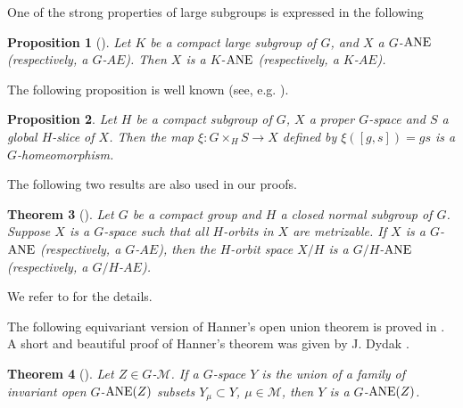 \documentclass{amsart}
\newtheorem{theorem}{Theorem}[section]
\newtheorem{proposition}[theorem]{Proposition}
\begin{document}
\medskip


One of the strong properties of large subgroups is expressed in the following

\begin{proposition}[{\cite[Proposition 3.4]{ant:jap}}]\label{P:large} Let $K$  be a compact  large  subgroup of $G$, and $X$  a  $G$-${\rm ANE}$ (respectively, a $G$-$AE$). Then  $X$ is  a $K$-${\rm ANE}$ (respectively, a $K$-$AE$).
\end{proposition}


\medskip
  
  The following proposition is well known  (see, e.g. \cite[Lemma 3.5]{abe:78}).
  
  \begin{proposition}\label{twist} Let  $H$ be a compact subgroup of $G$, $X$  a proper $G$-space and  $S$ a global $H$-slice of $X$.  Then  the  map  $\xi:G\times_H S\to X$ defined by $\xi([g, s])=gs$ is a $G$-homeomorphism.
\end{proposition}

The following two results are also used in our proofs.

\medskip
  



\begin{theorem}[\cite{ant:99}]\label{T:21}
Let $G$ be a compact group and  $H$  a closed normal subgroup of $G$. Suppose $X$ is a $G$-space such that all  $H$-orbits in $X$ are metrizable. 
 If  $X$ is a $G$-${\rm ANE}$ (respectively, a $G$-$AE$),  then the $H$-orbit space $X/H$ is a $G/H$-${\rm ANE}$ (respectively, a $G/H$-$AE$). 

\end{theorem}


We refer to  \cite[Theorem 1]{ant:99} for the  details.

\medskip

The following  equivariant version of   Hanner's open union theorem \cite[Theorem 19.2]{ha:52} is proved in \cite[Corollary 5.7]{ant:jap}. A  short and beautiful proof of Hanner's theorem 
was given by J. Dydak \cite[Corollary 1.5]{dy:pp}.

\begin{theorem}[\cite{ant:jap}]\label{T:Un} Let $Z\in G$-$\mathcal M$.
 If a  $G$-space $Y$ is the  union of a  family of  invariant open 
$G$-${\rm ANE}(Z)$ subsets $Y_\mu\subset Y$, $\mu\in \mathcal M$, then $Y$ is a $G$-${\rm ANE}(Z)$. 
\end{theorem}

\smallskip
\end{document}
